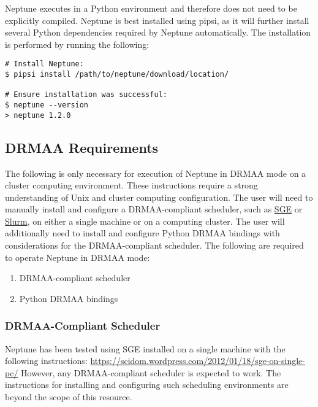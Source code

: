 \documentclass[a4paper,10pt]{article}
\begin{document}
Neptune executes in a Python environment and therefore does not need to be explicitly compiled. Neptune is best installed using pipsi, as it will further install several Python dependencies required by Neptune automatically. The installation is performed by running the following:

\begin{lstlisting}
# Install Neptune:
$ pipsi install /path/to/neptune/download/location/

# Ensure installation was successful:
$ neptune --version
> neptune 1.2.0
\end{lstlisting}

\newpage
\subsection{DRMAA Requirements}

The following is only necessary for execution of Neptune in DRMAA mode on a cluster computing environment. These instructions require a strong understanding of Unix and cluster computing configuration. The user will need to manually install and configure a DRMAA-compliant scheduler, such as \href{http://gridscheduler.sourceforge.net/}{SGE} or \href{http://slurm.schedmd.com/}{Slurm}, on either a single machine or on a computing cluster. The user will additionally need to install and configure Python DRMAA bindings with considerations for the DRMAA-compliant scheduler. The following are required to operate Neptune in DRMAA mode:

\begin{enumerate}
  \item DRMAA-compliant scheduler
  \item Python DRMAA bindings
\end{enumerate}

\subsubsection{DRMAA-Compliant Scheduler}

Neptune has been tested using SGE installed on a single machine with the following instructions:
\newline\newline
\url{https://scidom.wordpress.com/2012/01/18/sge-on-single-pc/}
\newline\newline
However, any DRMAA-compliant scheduler is expected to work. The instructions for installing and configuring such scheduling environments are beyond the scope of this resource.
\end{document}
